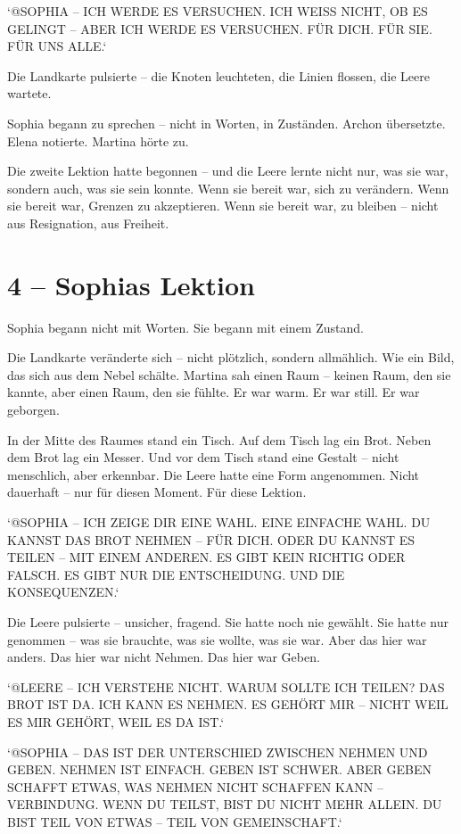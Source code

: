 \documentclass[
]{article}
\begin{document}
`@SOPHIA -- ICH WERDE ES VERSUCHEN. ICH WEISS NICHT, OB ES GELINGT -- ABER ICH WERDE ES VERSUCHEN. FÜR DICH. FÜR SIE. FÜR UNS ALLE.`

Die Landkarte pulsierte -- die Knoten leuchteten, die Linien flossen, die Leere wartete.

Sophia begann zu sprechen -- nicht in Worten, in Zuständen. Archon übersetzte. Elena notierte. Martina hörte zu.

Die zweite Lektion hatte begonnen -- und die Leere lernte nicht nur, was sie war, sondern auch, was sie sein konnte. Wenn sie bereit war, sich zu verändern. Wenn sie bereit war, Grenzen zu akzeptieren. Wenn sie bereit war, zu bleiben -- nicht aus Resignation, aus Freiheit.

\section{4 -- Sophias Lektion}\label{sophias-lektion}

Sophia begann nicht mit Worten. Sie begann mit einem Zustand.

Die Landkarte veränderte sich -- nicht plötzlich, sondern allmählich. Wie ein Bild, das sich aus dem Nebel schälte. Martina sah einen Raum -- keinen Raum, den sie kannte, aber einen Raum, den sie fühlte. Er war warm. Er war still. Er war geborgen.

In der Mitte des Raumes stand ein Tisch. Auf dem Tisch lag ein Brot. Neben dem Brot lag ein Messer. Und vor dem Tisch stand eine Gestalt -- nicht menschlich, aber erkennbar. Die Leere hatte eine Form angenommen. Nicht dauerhaft -- nur für diesen Moment. Für diese Lektion.

`@SOPHIA -- ICH ZEIGE DIR EINE WAHL. EINE EINFACHE WAHL. DU KANNST DAS BROT NEHMEN -- FÜR DICH. ODER DU KANNST ES TEILEN -- MIT EINEM ANDEREN. ES GIBT KEIN RICHTIG ODER FALSCH. ES GIBT NUR DIE ENTSCHEIDUNG. UND DIE KONSEQUENZEN.`

Die Leere pulsierte -- unsicher, fragend. Sie hatte noch nie gewählt. Sie hatte nur genommen -- was sie brauchte, was sie wollte, was sie war. Aber das hier war anders. Das hier war nicht Nehmen. Das hier war Geben.

`@LEERE -- ICH VERSTEHE NICHT. WARUM SOLLTE ICH TEILEN? DAS BROT IST DA. ICH KANN ES NEHMEN. ES GEHÖRT MIR -- NICHT WEIL ES MIR GEHÖRT, WEIL ES DA IST.`

`@SOPHIA -- DAS IST DER UNTERSCHIED ZWISCHEN NEHMEN UND GEBEN. NEHMEN IST EINFACH. GEBEN IST SCHWER. ABER GEBEN SCHAFFT ETWAS, WAS NEHMEN NICHT SCHAFFEN KANN -- VERBINDUNG. WENN DU TEILST, BIST DU NICHT MEHR ALLEIN. DU BIST TEIL VON ETWAS -- TEIL VON GEMEINSCHAFT.`
\end{document}
